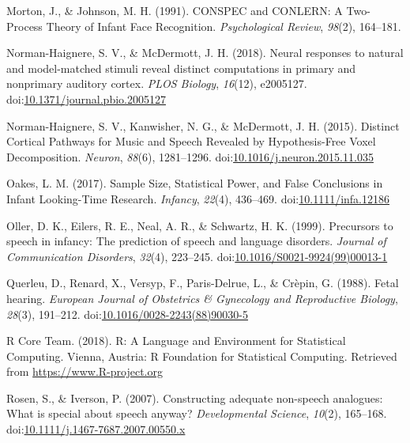 \documentclass[man]{apa6}
\begin{document}
\hypertarget{ref-morton_conspec_1991}{}
Morton, J., \& Johnson, M. H. (1991). CONSPEC and CONLERN: A Two-Process
Theory of Infant Face Recognition. \emph{Psychological Review},
\emph{98}(2), 164--181.

\hypertarget{ref-norman-haignere_neural_2018}{}
Norman-Haignere, S. V., \& McDermott, J. H. (2018). Neural responses to
natural and model-matched stimuli reveal distinct computations in
primary and nonprimary auditory cortex. \emph{PLOS Biology},
\emph{16}(12), e2005127.
doi:\href{https://doi.org/10.1371/journal.pbio.2005127}{10.1371/journal.pbio.2005127}

\hypertarget{ref-norman-haignere_distinct_2015}{}
Norman-Haignere, S. V., Kanwisher, N. G., \& McDermott, J. H. (2015).
Distinct Cortical Pathways for Music and Speech Revealed by
Hypothesis-Free Voxel Decomposition. \emph{Neuron}, \emph{88}(6),
1281--1296.
doi:\href{https://doi.org/10.1016/j.neuron.2015.11.035}{10.1016/j.neuron.2015.11.035}

\hypertarget{ref-oakes_sample_2017}{}
Oakes, L. M. (2017). Sample Size, Statistical Power, and False
Conclusions in Infant Looking-Time Research. \emph{Infancy},
\emph{22}(4), 436--469.
doi:\href{https://doi.org/10.1111/infa.12186}{10.1111/infa.12186}

\hypertarget{ref-oller_precursors_1999}{}
Oller, D. K., Eilers, R. E., Neal, A. R., \& Schwartz, H. K. (1999).
Precursors to speech in infancy: The prediction of speech and language
disorders. \emph{Journal of Communication Disorders}, \emph{32}(4),
223--245.
doi:\href{https://doi.org/10.1016/S0021-9924(99)00013-1}{10.1016/S0021-9924(99)00013-1}

\hypertarget{ref-querleu_fetal_1988}{}
Querleu, D., Renard, X., Versyp, F., Paris-Delrue, L., \& Crèpin, G.
(1988). Fetal hearing. \emph{European Journal of Obstetrics \&
Gynecology and Reproductive Biology}, \emph{28}(3), 191--212.
doi:\href{https://doi.org/10.1016/0028-2243(88)90030-5}{10.1016/0028-2243(88)90030-5}

\hypertarget{ref-r_core_team_r:_2018}{}
R Core Team. (2018). R: A Language and Environment for Statistical
Computing. Vienna, Austria: R Foundation for Statistical Computing.
Retrieved from \url{https://www.R-project.org}

\hypertarget{ref-rosen_constructing_2007}{}
Rosen, S., \& Iverson, P. (2007). Constructing adequate non-speech
analogues: What is special about speech anyway? \emph{Developmental
Science}, \emph{10}(2), 165--168.
doi:\href{https://doi.org/10.1111/j.1467-7687.2007.00550.x}{10.1111/j.1467-7687.2007.00550.x}
\end{document}
